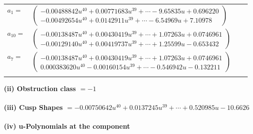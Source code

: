 \documentclass[1p]{elsarticle_modified}
\theoremstyle{definition}
\begin{document}
\begin{tabular}{m{7pt} m{180pt} m{7pt} m{180pt} }
\flushright $a_{1}=$&$\begin{pmatrix}-0.00488842 u^{40}+0.00771683 u^{39}+\cdots-9.65835 u+0.696220\\-0.00492654 u^{40}+0.0142911 u^{39}+\cdots-6.54969 u+7.10978\end{pmatrix}$ \\
\flushright $a_{10}=$&$\begin{pmatrix}-0.00138487 u^{40}+0.00430419 u^{39}+\cdots+1.07263 u+0.0746961\\-0.00129140 u^{40}+0.00419737 u^{39}+\cdots+1.25599 u-0.653432\end{pmatrix}$ \\
\flushright $a_{7}=$&$\begin{pmatrix}-0.00138487 u^{40}+0.00430419 u^{39}+\cdots+1.07263 u+0.0746961\\0.000383620 u^{40}-0.00160154 u^{39}+\cdots-0.546942 u-0.132211\end{pmatrix}$\\&\end{tabular}
\flushleft \textbf{(ii) Obstruction class $= -1$}\\~\\
\flushleft \textbf{(iii) Cusp Shapes $= -0.00750642 u^{40}+0.0137245 u^{39}+\cdots+0.520985 u-10.6626$}\\~\\
\newpage\renewcommand{\arraystretch}{1}
\flushleft \textbf{(iv) u-Polynomials at the component}\newline \\
\end{document}
